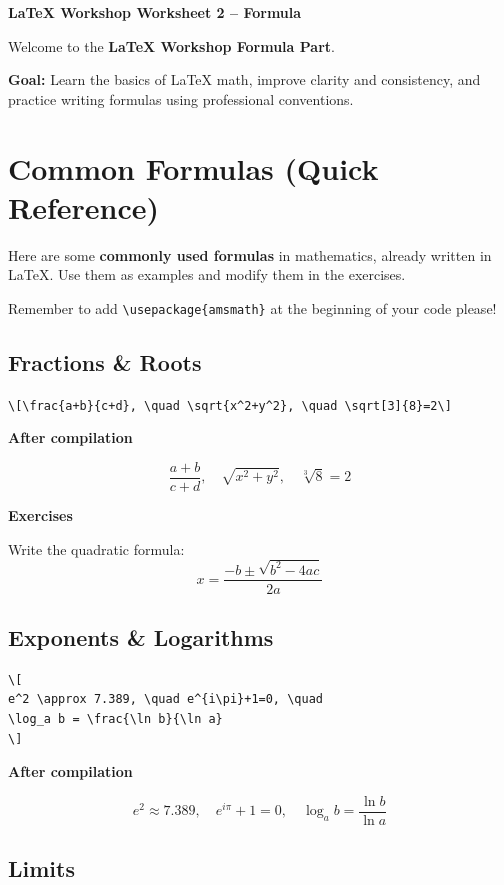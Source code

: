 \documentclass[12pt,a4paper]{article}
\begin{document}
\begin{center}
    {\color[HTML]{2E86C1}\fontsize{24}{28}\selectfont\textbf{LaTeX Workshop Worksheet 2 -- Formula}}
\end{center}

Welcome to the {\color[HTML]{117A65}\textbf{LaTeX Workshop Formula Part}}.

{\color[HTML]{7D3C98}\textbf{Goal:}} Learn the basics of LaTeX math, improve clarity and consistency, and practice writing formulas using professional conventions.

\hrulefill

\section{\color[HTML]{C0392B}Common Formulas (Quick Reference)}

Here are some \textbf{commonly used formulas} in mathematics, already written in LaTeX.
Use them as examples and modify them in the exercises.

Remember to add \verb|\usepackage{amsmath}| at the beginning of your code please!

\subsection{Fractions \& Roots}

\verb|\[\frac{a+b}{c+d}, \quad \sqrt{x^2+y^2}, \quad \sqrt[3]{8}=2\]|

\textbf{After compilation}

\[
\frac{a+b}{c+d}, \quad \sqrt{x^2+y^2}, \quad \sqrt[3]{8}=2
\]

\textbf{\color[HTML]{CA6F1E}Exercises}

Write the quadratic formula:
\[
x=\frac{-b\pm\sqrt{b^2-4ac}}{2a}
\]

\subsection{Exponents \& Logarithms}

\begin{verbatim}
\[
e^2 \approx 7.389, \quad e^{i\pi}+1=0, \quad
\log_a b = \frac{\ln b}{\ln a}
\]
\end{verbatim}

\textbf{After compilation}

\[
e^2 \approx 7.389, \quad e^{i\pi}+1=0, \quad
\log_a b = \frac{\ln b}{\ln a}
\]

\subsection{Limits}
\end{document}
